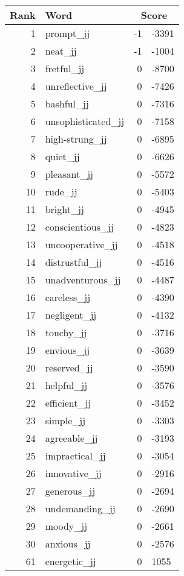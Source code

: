 \begin{longtable}[!htbp]{| rlr@{.}l |}
    \hline
    \textbf{Rank} & \textbf{Word} & \multicolumn{2}{c|}{\textbf{Score}} \\
    \hline
    \endhead
    1 & prompt\_jj & -1 & -3391 \\
    2 & neat\_jj & -1 & -1004 \\
    3 & fretful\_jj & 0 & -8700 \\
    4 & unreflective\_jj & 0 & -7426 \\
    5 & bashful\_jj & 0 & -7316 \\
    6 & unsophisticated\_jj & 0 & -7158 \\
    7 & high-strung\_jj & 0 & -6895 \\
    8 & quiet\_jj & 0 & -6626 \\
    9 & pleasant\_jj & 0 & -5572 \\
    10 & rude\_jj & 0 & -5403 \\
    11 & bright\_jj & 0 & -4945 \\
    12 & conscientious\_jj & 0 & -4823 \\
    13 & uncooperative\_jj & 0 & -4518 \\
    14 & distrustful\_jj & 0 & -4516 \\
    15 & unadventurous\_jj & 0 & -4487 \\
    16 & careless\_jj & 0 & -4390 \\
    17 & negligent\_jj & 0 & -4132 \\
    18 & touchy\_jj & 0 & -3716 \\
    19 & envious\_jj & 0 & -3639 \\
    20 & reserved\_jj & 0 & -3590 \\
    21 & helpful\_jj & 0 & -3576 \\
    22 & efficient\_jj & 0 & -3452 \\
    23 & simple\_jj & 0 & -3303 \\
    24 & agreeable\_jj & 0 & -3193 \\
    25 & impractical\_jj & 0 & -3054 \\
    26 & innovative\_jj & 0 & -2916 \\
    27 & generous\_jj & 0 & -2694 \\
    28 & undemanding\_jj & 0 & -2690 \\
    29 & moody\_jj & 0 & -2661 \\
    30 & anxious\_jj & 0 & -2576 \\
    61 & energetic\_jj & 0 & 1055 \\

\end{longtable}
